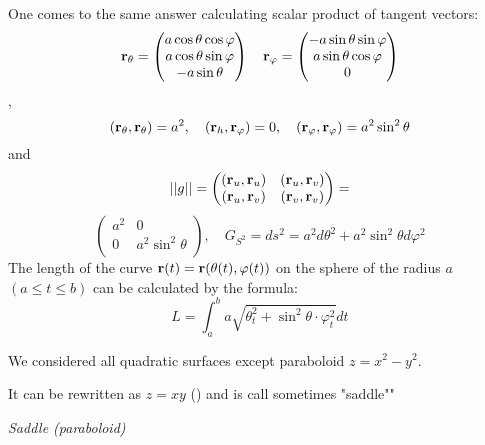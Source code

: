 \documentclass[12pt]{article}
\theoremstyle{theorem}
\numberwithin{equation}{section}
\begin{document}
One comes to the same answer calculating scalar product of tangent vectors:
  \begin{equation}\label{c}
  {\bf r}_\theta=\begin{pmatrix}
        a\cos\theta\cos\varphi\\
        a\cos\theta\sin\varphi\\
        -a\sin\theta\\
   \end{pmatrix}
\quad
  {\bf r}_\varphi=\begin{pmatrix}
        -a\sin\theta\sin\varphi\\
        a\sin\theta\cos\varphi\\
          0\\
   \end{pmatrix}
 \end{equation},
            $$
     ({\bf r}_\theta,{\bf r}_\theta)=a^2,\quad
     ({\bf r}_h,{\bf r}_\varphi)=0,\quad
     ({\bf r}_\varphi,{\bf r}_\varphi)=a^2\sin^2\theta
            $$
and
\begin{equation*}\label{formula forfirstform3*}
   ||g||=
   \begin{pmatrix}
   ({\bf r}_u,{\bf r}_u) & ({\bf r}_u,{\bf r}_v) \\
   ({\bf r}_u,{\bf r}_v) & ({\bf r}_v,{\bf r}_v) \\
   \end{pmatrix}=
\end{equation*}
\begin{equation*}\label{formula forfirstformsphere}
   \begin{pmatrix}
   a^2 & 0 \\
   0&  a^2\sin^2\theta \\
   \end{pmatrix}, \quad
   G_{S^2}=ds^2=a^2d\theta^2+a^2\sin^2\theta d\varphi^2
\end{equation*}
  The length of the curve ${\bf r}(t)={\bf r} (\theta(t), \varphi(t))$ on the
  sphere of the radius $a$
    $(a\leq t\leq b)$
  can be calculated by the formula:
               \begin{equation}
             L=\int_a^b
             a\sqrt{\theta_t^2+\sin^2\theta\cdot \varphi_t^2}dt
               \end{equation}


We considered all quadratic surfaces except paraboloid $z=x^2-y^2$.

It can be rewritten as $z=xy$ () and is call sometimes "saddle""

\centerline {\it Saddle (paraboloid)}


\medskip
\end{document}

